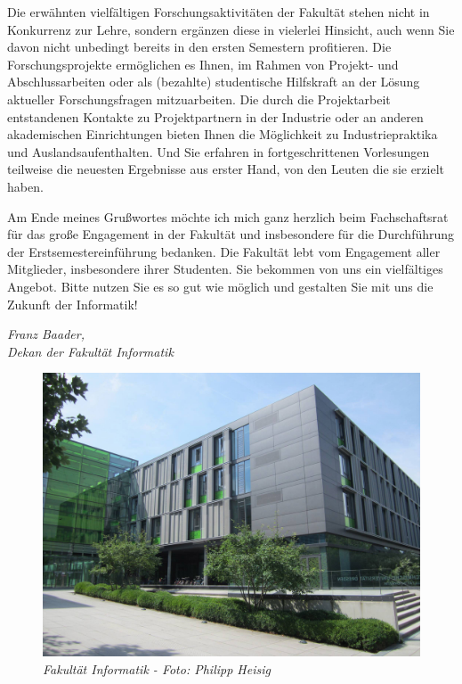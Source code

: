 Die erwähnten vielfältigen Forschungsaktivitäten der Fakultät stehen nicht in Konkurrenz zur Lehre, sondern ergänzen diese in vielerlei Hinsicht, auch wenn Sie davon nicht unbedingt bereits in den ersten Semestern profitieren. Die Forschungsprojekte ermöglichen es Ihnen, im Rahmen von Projekt- und Abschlussarbeiten oder als (bezahlte) studentische Hilfskraft an der Lösung aktueller Forschungsfragen mitzuarbeiten. Die durch die Projektarbeit entstandenen Kontakte zu Projektpartnern in der Industrie oder an anderen akademischen Einrichtungen bieten Ihnen die Möglichkeit zu Industriepraktika und Auslandsaufenthalten. Und Sie erfahren in fortgeschrittenen Vorlesungen teilweise die neuesten Ergebnisse aus erster Hand, von den Leuten die sie erzielt haben.

Am Ende meines Grußwortes möchte ich mich ganz herzlich beim Fachschaftsrat für das große Engagement in der Fakultät und insbesondere für die Durchführung der Erstsemestereinführung bedanken. Die Fakultät lebt vom Engagement aller Mitglieder, insbesondere ihrer Studenten. Sie bekommen von uns ein vielfältiges Angebot. Bitte nutzen Sie es so gut wie möglich und gestalten Sie mit uns die Zukunft der Informatik!

\textit{Franz Baader,\\
Dekan der Fakultät Informatik}

\vfill

\begin{figure}[h!]
\centering
\includegraphics[width=.9\linewidth]{img/fakultaet.jpg}
\caption*{\small \textit{Fakultät Informatik - Foto: Philipp Heisig}}
\end{figure}

